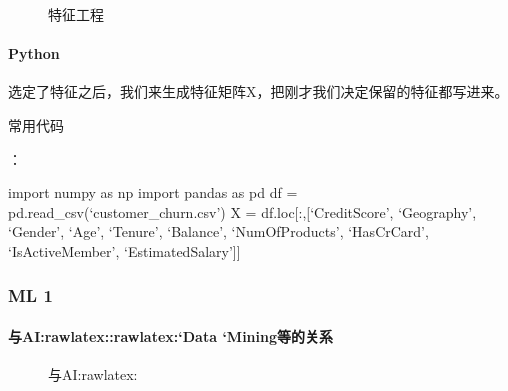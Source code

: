 \documentclass[letterpaper,10pt,english]{sphinxmanual}
\begin{document}
\begin{figure}[H]
\centering
\capstart

\noindent{}
\caption{特征工程}\label{\detokenize{chapter_AI_dive/feature_engineering:id2}}\end{figure}


\paragraph{Python}
\label{\detokenize{chapter_AI_dive/feature_engineering:python}}
选定了特征之后，我们来生成特征矩阵X，把刚才我们决定保留的特征都写进来。

常用代码%
\begin{footnote}[920]\sphinxAtStartFootnote
{}
%
\end{footnote}：

import numpy as np import pandas as pd df =
pd.read\_csv(‘customer\_churn.csv’) X = df.loc{[}:,{[}‘CreditScore’,
‘Geography’, ‘Gender’, ‘Age’, ‘Tenure’, ‘Balance’, ‘NumOfProducts’,
‘HasCrCard’, ‘IsActiveMember’, ‘EstimatedSalary’{]}{]}


\subsubsection{ML 1\sphinxfootnotemark[921]}
\label{\detokenize{chapter_AI_dive/ML:ml-1}}\label{\detokenize{chapter_AI_dive/ML::doc}}%
\begin{footnotetext}[921]\sphinxAtStartFootnote
{}
%
\end{footnotetext}\ignorespaces 

\paragraph{与AI:raw\sphinxhyphen{}latex::raw\sphinxhyphen{}latex:{\color{red}\bfseries{}`}Data {\color{red}\bfseries{}`}Mining等的关系}
\label{\detokenize{chapter_AI_dive/ML:ai-raw-latex-dl-raw-latex-data-mining}}
\begin{figure}[H]
\centering
\capstart

\noindent{}
\caption{与AI:raw\sphinxhyphen{}latex:}\label{\detokenize{chapter_AI_dive/ML:id22}}
\begin{sphinxlegend}\end{sphinxlegend}
\end{figure}
\end{document}
